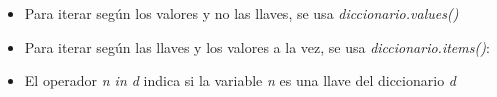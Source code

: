\begin{itemize}
    \item Para iterar según los valores y no las llaves, se usa \textit{diccionario.values()}
    
    \item Para iterar según las llaves y los valores a la vez, se usa \textit{diccionario.items()}:
    
    \item El operador \textit{n in d} indica si la variable \textit{n} es una llave del diccionario \textit{d}
\end{itemize}
